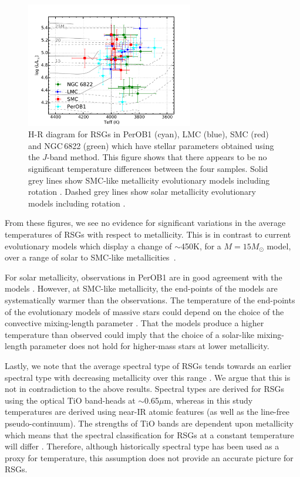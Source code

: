 \begin{figure}
 \centering
\includegraphics[width=0.65\textwidth]{ngc6822/N6822_HRD_all}
\caption{
H-R diagram for RSGs in PerOB1 (cyan), LMC (blue), SMC (red) and NGC\,6822 (green) which have stellar parameters obtained using the $J$-band method.
This figure shows that there appears to be no significant temperature differences between the four samples.
Solid grey lines show SMC-like metallicity evolutionary models including rotation
\protect\citep{2013A&A...558A.103G}.
Dashed grey lines show solar metallicity evolutionary models including rotation
\protect\citep{2012A&A...537A.146E}.\label{fig:HRD}
        }
\end{figure}


From these figures, we see no evidence for significant variations in the average temperatures of RSGs with respect to metallicity.
This is in contrast to current evolutionary models which display a change of $\sim$450K,
for a $M=15M_{\odot}$ model,
over a range of solar to SMC-like metallicities~\citep{2012A&A...537A.146E,2013A&A...558A.103G}.

For solar metallicity, observations in PerOB1 are in good agreement with the models
\citep[see Figure 9 in][]{2014ApJ...788...58G}.
However, at SMC-like metallicity, the end-points of the models are systematically warmer than the observations.
The temperature of the end-points of the evolutionary models of massive stars could depend on the choice of the convective mixing-length parameter
\citep{1992A&AS...96..269S}.
That the models produce a higher temperature than observed could imply that the choice of a solar-like mixing-length parameter does not hold for higher-mass stars at lower metallicity.

Lastly, we note that the average spectral type of RSGs tends towards an earlier spectral type with decreasing metallicity over this range
\citep{1979ApJ...231..384H,2012AJ....144....2L}.
We argue that this is not in contradiction to the above results.
Spectral types are derived for RSGs using the optical TiO band-heads at
$\sim$0.65$\mu$m,
whereas in this study temperatures are derived using near-IR atomic features
(as well as the line-free pseudo-continuum).
The strengths of TiO bands are dependent upon metallicity which means that
the spectral classification for RSGs at a constant temperature will differ
\citep{2013ApJ...767....3D}.
Therefore, although historically spectral type has been used as a proxy for temperature, this assumption does not provide an accurate picture for RSGs.

